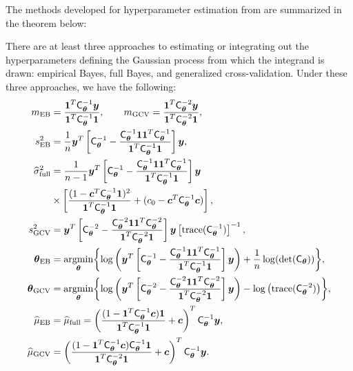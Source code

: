 \documentclass{svjour3}                     %
\newcommand{\bm}[1]{\boldsymbol{#1}}
\newcommand{\trace}[1]{\textup{trace}{#1}}
\newcommand{\vtheta}{{\bm{\theta}}}
\newcommand{\vc}{\bm{c}}
\newcommand{\vy}{\bm{y}}
\newcommand{\vone}{\bm{1}}
\newcommand{\mC}{\mathsf{C}}
\newcommand{\mCthetaInv}{{\mathsf{C}^{-1}_{\vtheta}}}
\newcommand{\hmu}{\widehat{\mu}}
\newcommand{\hsigma}{\widehat{\sigma}}
\newcommand{\MLE}{\textup{EB}}
\newcommand{\full}{\textup{full}}
\newcommand{\GCV}{\textup{GCV}}
\providecommand{\argmin}{\operatorname*{argmin}}
\begin{document}
The methods developed for hyperparameter estimation from \cite{JagHic19a} are summarized in the theorem below:
\begin{theorem} \label{thm:param} There are at least three approaches to estimating or integrating out the hyperparameters defining the Gaussian process from which the integrand is drawn: empirical Bayes, full Bayes, and generalized cross-validation.  %
	Under these three approaches, we have the following:
	\begin{align}
	\label{eqn_m_MLE}
	m_\MLE &= \frac{\vone^T \mCthetaInv \vy }{ \vone^T \mCthetaInv \vone}, \qquad
	m_{\textup{GCV}} = \frac{\vone^T \mC_\vtheta^{-2} \vy}{\vone^T \mC_\vtheta^{-2} \vone}, \\
	\label{eqn_s2_MLE}
	s^2_{\MLE} 
	&= 
	\frac{1}{n}
	\vy^T 
	\left[ \mCthetaInv - 
	\frac{ \mCthetaInv \vone \vone^T \mCthetaInv }{\vone^T\mCthetaInv \vone}
	\right] \vy, \\
	\nonumber
	\hsigma_{\full}^2 
	& = \frac{1}{n-1}
	\vy^T\left[ \mCthetaInv 
	- \frac{ \mCthetaInv \vone\vone^T \mCthetaInv}{\vone^T \mCthetaInv \vone}  \right]\vy
	\\ 
	\label{eqn:sigma2_full}
	& \times  \left[\frac{(1 - \vc^T \mCthetaInv \vone)^2}{\vone^T \mCthetaInv \vone} + (c_{0}  -\vc ^T \mCthetaInv \vc) \right], \\
	\nonumber
	s^2_{\textup{GCV}} & = \vy^T \left[\mC_\vtheta^{-2} - \frac{\mC_\vtheta^{-2} \vone \vone^T \mC_\vtheta^{-2}}{\vone^T \mC_\vtheta^{-2} \vone}  \right] \vy  \left[ \trace(\mCthetaInv) \right]^{-1}, \\
	\label{eqn:thetaMLE}
	\vtheta_\MLE
	&= \argmin_{\vtheta} \biggl \{
	\log\left(\vy^T 
	\left[ \mCthetaInv - 
	\frac{ \mCthetaInv \vone \vone^T \mCthetaInv }{\vone^T\mCthetaInv \vone}
	\right] \vy 
	\right)  
	+  \frac{1}{n} \log(\det(\mC_\vtheta))
	\biggr \}, \\
	\label{vthetaGCV}
	\vtheta_{\GCV} &= \argmin_\vtheta \biggl\{\log \left(  \vy^T \left[\mC^{-2}_\vtheta - \frac{\mC^{-2}_\vtheta \vone \vone^T \mC^{-2}_\vtheta}{\vone^T \mC^{-2}_\vtheta \vone}  \right] \vy \right)  
	- \log \left ( \trace(\mC^{-2}_\vtheta) \right ) \biggr\}, \\
	\label{eqn:cubMLE}
	\hmu_\MLE  &= \hmu_\full =
	\left(
	\frac{ (1 - \vone^T  \mCthetaInv\vc )  \vone }{ \vone^T \mCthetaInv \vone}   +  \vc 
	\right)^T  \mCthetaInv \vy, \\
	\label{eqn:muCV}
	\hmu_{\GCV}
	& = \left(\frac{(1 - \vone^T  \mCthetaInv\vc) \mCthetaInv \vone}{\vone^T \mC_\vtheta^{-2} \vone} + \vc \right)^T \mCthetaInv \vy.

\end{align}
\end{theorem}
\end{document}
